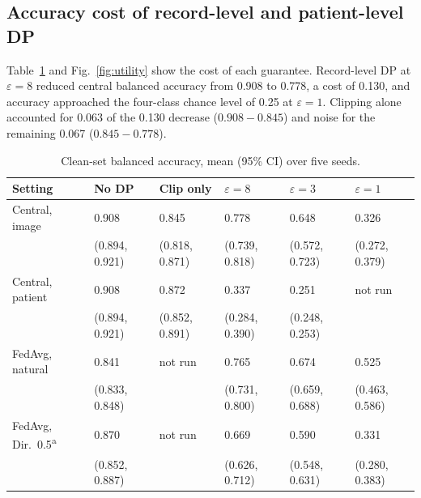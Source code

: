 \documentclass[preprint,12pt]{elsarticle}
\begin{document}
\subsection{Accuracy cost of record-level and patient-level DP}
Table~\ref{tab:utility} and Fig.~\ref{fig:utility} show the cost of each guarantee. Record-level DP at $\varepsilon=8$
reduced central balanced accuracy from 0.908 to 0.778, a cost of 0.130, and accuracy approached the four-class chance
level of 0.25 at $\varepsilon=1$. Clipping alone accounted for 0.063 of the 0.130 decrease ($0.908-0.845$) and noise
for the remaining 0.067 ($0.845-0.778$).

\begin{table}[htbp]
\caption{Clean-set balanced accuracy, mean (95\% CI) over five seeds.}
\label{tab:utility}
\footnotesize\setlength{\tabcolsep}{3pt}
\begin{tabular*}{\linewidth}{@{\extracolsep{\fill}}llllll@{}}
\toprule
Setting & No DP & Clip only & $\varepsilon=8$ & $\varepsilon=3$ & $\varepsilon=1$\\
\midrule
Central, image & 0.908 & 0.845 & 0.778 & 0.648 & 0.326\\
 & {\scriptsize (0.894, 0.921)} & {\scriptsize (0.818, 0.871)} & {\scriptsize (0.739, 0.818)} & {\scriptsize (0.572, 0.723)} & {\scriptsize (0.272, 0.379)}\\[2pt]
Central, patient & 0.908 & 0.872 & 0.337 & 0.251 & not run\\
 & {\scriptsize (0.894, 0.921)} & {\scriptsize (0.852, 0.891)} & {\scriptsize (0.284, 0.390)} & {\scriptsize (0.248, 0.253)} & \\[2pt]
FedAvg, natural & 0.841 & not run & 0.765 & 0.674 & 0.525\\
 & {\scriptsize (0.833, 0.848)} &  & {\scriptsize (0.731, 0.800)} & {\scriptsize (0.659, 0.688)} & {\scriptsize (0.463, 0.586)}\\[2pt]
FedAvg, Dir.~0.5\textsuperscript{a} & 0.870 & not run & 0.669 & 0.590 & 0.331\\
 & {\scriptsize (0.852, 0.887)} &  & {\scriptsize (0.626, 0.712)} & {\scriptsize (0.548, 0.631)} & {\scriptsize (0.280, 0.383)}\\[2pt]
\bottomrule
\end{tabular*}
\par{}
\end{table}
\end{document}
